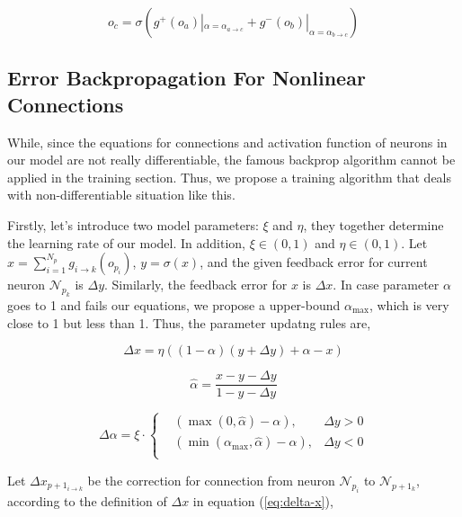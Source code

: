 \documentclass[conference]{IEEEtran}
\begin{document}
\begin{equation}
    o_c=\sigma(g^{+}(o_a)|_{\alpha=\alpha_{a\rightarrow c}} +
    g^{-}(o_b)|_{\alpha=\alpha_{b\rightarrow c}})
    \label{eq:forward-example}
\end{equation}

\subsection{Error Backpropagation For Nonlinear Connections}
While, since the equations for connections and activation function
of neurons in our model are not really differentiable, the famous
backprop algorithm cannot be applied in the training section. Thus,
we propose a training algorithm that deals with non-differentiable
situation like this.


Firstly, let's introduce two model parameters: $\xi$ and $\eta$,
they together determine the learning rate of our model. In addition,
$\xi\in(0,1)$ and $\eta\in(0,1)$. Let
$x=\sum_{i=1}^{N_p}g_{i\rightarrow{k}}(o_{p_i})$, $y=\sigma(x)$, and the given
feedback error for current neuron $\mathcal{N}_{p_k}$ is $\Delta y$.
Similarly, the feedback error for $x$ is $\Delta x$. In case parameter $\alpha$
goes to 1 and fails our equations, we propose a upper-bound $\alpha_{\max}$, which
is very close to 1 but less than 1.
Thus, the parameter updatng rules are,

\begin{equation}
    \Delta{x} = \eta\left((1-\alpha)(y+\Delta{y})+\alpha-x\right)
    \label{eq:delta-x}
\end{equation}

\begin{equation}
    \hat{\alpha}=\frac{x-y-\Delta{y}}{1-y-\Delta{y}}
    \label{eq:expected-alpha}
\end{equation}

\begin{equation}
\Delta{\alpha} =\xi\cdot\left\{
    \begin{aligned}
        &\left(\max\left(0,\hat{\alpha}\right)-\alpha\right),&\Delta{y}>0\\
        &\left(\min\left(\alpha_{\max}, \hat{\alpha}\right)-\alpha\right),&\Delta{y}<0\\
    \end{aligned}
    \right.
\label{eq:delta-alpha}
\end{equation}

Let $\Delta x_{p+1_{i\rightarrow{k}}}$ be the correction for connection
from neuron $\mathcal{N}_{p_i}$ to $\mathcal{N}_{p+1_k}$,
according to the definition of $\Delta x$ in equation (\ref{eq:delta-x}),
\end{document}
